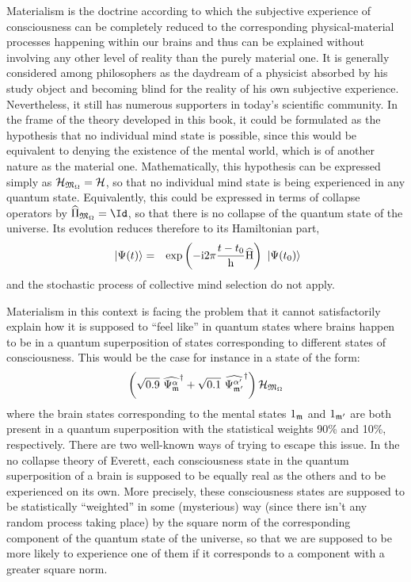 Materialism is the doctrine according to which the subjective experience of consciousness can be completely reduced to the corresponding physical-material processes happening within our brains and thus can be explained without involving any other level of reality than the purely material one. It is generally considered among philosophers as the daydream of a physicist absorbed by his study object and becoming blind for the reality of his own subjective experience. Nevertheless, it still has numerous supporters in today's scientific community. In the frame of the theory developed in this book, it could be formulated as the hypothesis that no individual mind state is possible, since this would be equivalent to denying the existence of the mental world, which is of another nature as the material one. Mathematically, this hypothesis can be expressed simply as $\mathcal H_{\mathfrak{M}_\Omega} = \mathcal H$, so that no individual mind state is being experienced in any quantum state. Equivalently, this could be expressed in terms of collapse operators by $\op{\Pi}_{\cms_\vac} = \Id$, so that there is no collapse of the quantum state of the universe. Its evolution reduces therefore to its Hamiltonian part,
\begin{eqnarray*}
\ \left|{\Psi(t)}\right\rangle & = & \mathrm{exp} \left( {- \mathrm{i} 2 \pi \frac{t - t_0} {\mathrm h} \widehat{\mathrm H}} \right) \ \left|{\Psi(t_0)}\right\rangle
\end{eqnarray*}
and the stochastic process of collective mind selection do not apply.

Materialism in this context is facing the problem that it cannot satisfactorily explain how it is supposed to ``feel like'' in quantum states where brains happen to be in a quantum superposition of states corresponding to different states of consciousness. This would be the case for instance in a state of the form:
\begin{equation*}
\left(\sqrt{0.9}\ \widehat{\Psi_{\mathfrak{m}}^\alpha}^{\dagger} + \sqrt{0.1}\ \widehat{\Psi_{\mathfrak{m}'}^{\alpha'}}^{\dagger}\right) \mathcal H_{\mathfrak{M}_\Omega}
\end{equation*}
where the brain states corresponding to the mental states ${1}_{\mathfrak{m}}$ and ${1}_{\mathfrak{m}'}$ are both present in a quantum superposition with the statistical weights 90\% and 10\%, respectively. There are two well-known ways of trying to escape this issue. In the no collapse theory of Everett, each consciousness state in the quantum superposition of a brain is supposed to be equally real as the others and to be experienced on its own. More precisely, these consciousness states are supposed to be statistically ``weighted'' in some (mysterious) way (since there isn't any random process taking place) by the square norm of the corresponding component of the quantum state of the universe, so that we are supposed to be more likely to experience one of them if it corresponds to a component with a greater square norm.

